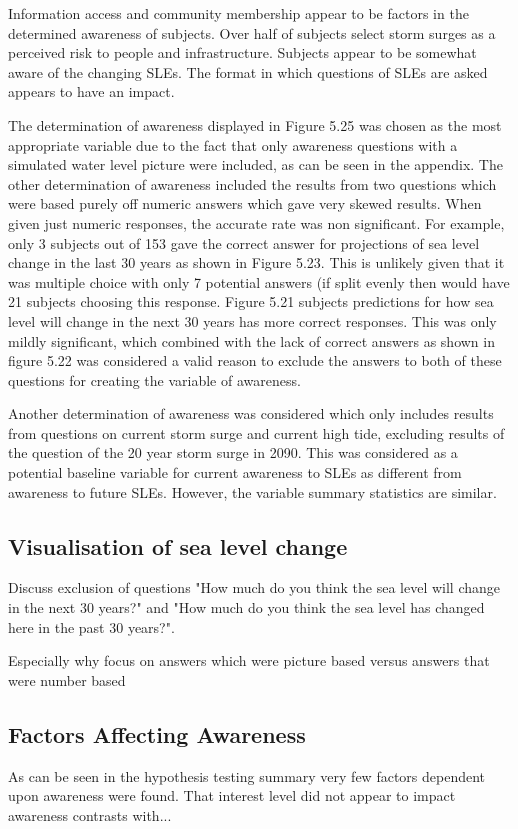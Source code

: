 Information access and community membership appear to be factors in the determined awareness of subjects. Over half of subjects select storm surges as a perceived risk to people and infrastructure. Subjects appear to be somewhat aware of the changing SLEs. The format in which questions of SLEs are asked appears to have an impact. 

The determination of awareness displayed in Figure 5.25 was chosen as the most appropriate variable due to the fact that only awareness questions with a simulated water level picture were included, as can be seen in the appendix. The other determination of awareness included the results from two questions which were based purely off numeric answers which gave very skewed results. When given just numeric responses, the accurate rate was non significant. For example, only 3 subjects out of 153 gave the correct answer for projections of sea level change in the last 30 years as shown in Figure 5.23.  This is unlikely given that it was multiple choice with only 7 potential answers (if split evenly then would have 21 subjects choosing this response. Figure 5.21 subjects predictions for how sea level will change in the next 30 years has more correct responses. This was only mildly significant, which combined with the lack of correct answers as shown in figure 5.22 was considered a valid reason to exclude the answers to both of these questions for creating the variable of awareness. 


Another determination of awareness was considered which only includes results from questions on current storm surge and current high tide, excluding results of the question of the 20 year storm surge in 2090. This was considered as a potential baseline variable for current awareness to SLEs as different from awareness to future SLEs. However, the variable summary statistics are similar.

\subsection{Visualisation of sea level change}
Discuss exclusion of questions "How much do you think the sea level will change in the next 30 years?" and "How much do you think the sea level has changed here in the past 30 years?". 

Especially why focus on answers which were picture based versus answers that were number based



\subsection{Factors Affecting Awareness}
As can be seen in the hypothesis testing summary very few factors dependent upon awareness were found. That interest level did not appear to impact awareness contrasts with...

